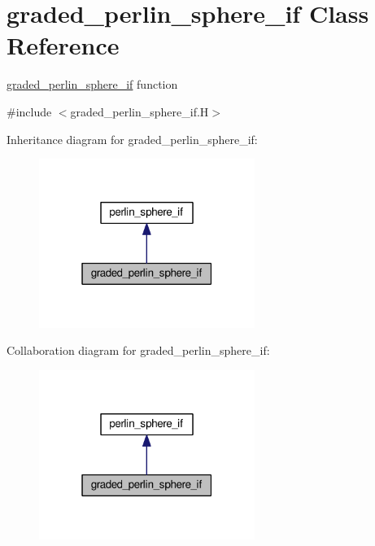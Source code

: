\hypertarget{classgraded__perlin__sphere__if}{}\section{graded\+\_\+perlin\+\_\+sphere\+\_\+if Class Reference}
\label{classgraded__perlin__sphere__if}


\hyperlink{classgraded__perlin__sphere__if}{graded\+\_\+perlin\+\_\+sphere\+\_\+if} function  




{\ttfamily \#include $<$graded\+\_\+perlin\+\_\+sphere\+\_\+if.\+H$>$}



Inheritance diagram for graded\+\_\+perlin\+\_\+sphere\+\_\+if\+:\nopagebreak
\begin{figure}[H]
\begin{center}
\leavevmode
\includegraphics[width=199pt]{classgraded__perlin__sphere__if__inherit__graph}
\end{center}
\end{figure}


Collaboration diagram for graded\+\_\+perlin\+\_\+sphere\+\_\+if\+:\nopagebreak
\begin{figure}[H]
\begin{center}
\leavevmode
\includegraphics[width=199pt]{classgraded__perlin__sphere__if__coll__graph}
\end{center}
\end{figure}
